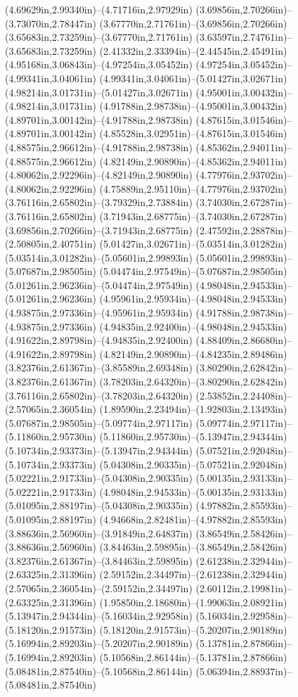(4.69629in,2.99340in)--(4.71716in,2.97929in) (3.69856in,2.70266in)--(3.73070in,2.78447in) (3.67770in,2.71761in)--(3.69856in,2.70266in) (3.65683in,2.73259in)--(3.67770in,2.71761in) (3.63597in,2.74761in)--(3.65683in,2.73259in) (2.41332in,2.33394in)--(2.44545in,2.45491in) (4.95168in,3.06843in)--(4.97254in,3.05452in) (4.97254in,3.05452in)--(4.99341in,3.04061in) (4.99341in,3.04061in)--(5.01427in,3.02671in) (4.98214in,3.01731in)--(5.01427in,3.02671in) (4.95001in,3.00432in)--(4.98214in,3.01731in) (4.91788in,2.98738in)--(4.95001in,3.00432in) (4.89701in,3.00142in)--(4.91788in,2.98738in) (4.87615in,3.01546in)--(4.89701in,3.00142in) (4.85528in,3.02951in)--(4.87615in,3.01546in) (4.88575in,2.96612in)--(4.91788in,2.98738in) (4.85362in,2.94011in)--(4.88575in,2.96612in) (4.82149in,2.90890in)--(4.85362in,2.94011in) (4.80062in,2.92296in)--(4.82149in,2.90890in) (4.77976in,2.93702in)--(4.80062in,2.92296in) (4.75889in,2.95110in)--(4.77976in,2.93702in) (3.76116in,2.65802in)--(3.79329in,2.73884in) (3.74030in,2.67287in)--(3.76116in,2.65802in) (3.71943in,2.68775in)--(3.74030in,2.67287in) (3.69856in,2.70266in)--(3.71943in,2.68775in) (2.47592in,2.28878in)--(2.50805in,2.40751in) (5.01427in,3.02671in)--(5.03514in,3.01282in) (5.03514in,3.01282in)--(5.05601in,2.99893in) (5.05601in,2.99893in)--(5.07687in,2.98505in) (5.04474in,2.97549in)--(5.07687in,2.98505in) (5.01261in,2.96236in)--(5.04474in,2.97549in) (4.98048in,2.94533in)--(5.01261in,2.96236in) (4.95961in,2.95934in)--(4.98048in,2.94533in) (4.93875in,2.97336in)--(4.95961in,2.95934in) (4.91788in,2.98738in)--(4.93875in,2.97336in) (4.94835in,2.92400in)--(4.98048in,2.94533in) (4.91622in,2.89798in)--(4.94835in,2.92400in) (4.88409in,2.86680in)--(4.91622in,2.89798in) (4.82149in,2.90890in)--(4.84235in,2.89486in) (3.82376in,2.61367in)--(3.85589in,2.69348in) (3.80290in,2.62842in)--(3.82376in,2.61367in) (3.78203in,2.64320in)--(3.80290in,2.62842in) (3.76116in,2.65802in)--(3.78203in,2.64320in) (2.53852in,2.24408in)--(2.57065in,2.36054in) (1.89590in,2.23494in)--(1.92803in,2.13493in) (5.07687in,2.98505in)--(5.09774in,2.97117in) (5.09774in,2.97117in)--(5.11860in,2.95730in) (5.11860in,2.95730in)--(5.13947in,2.94344in) (5.10734in,2.93373in)--(5.13947in,2.94344in) (5.07521in,2.92048in)--(5.10734in,2.93373in) (5.04308in,2.90335in)--(5.07521in,2.92048in) (5.02221in,2.91733in)--(5.04308in,2.90335in) (5.00135in,2.93133in)--(5.02221in,2.91733in) (4.98048in,2.94533in)--(5.00135in,2.93133in) (5.01095in,2.88197in)--(5.04308in,2.90335in) (4.97882in,2.85593in)--(5.01095in,2.88197in) (4.94668in,2.82481in)--(4.97882in,2.85593in) (3.88636in,2.56960in)--(3.91849in,2.64837in) (3.86549in,2.58426in)--(3.88636in,2.56960in) (3.84463in,2.59895in)--(3.86549in,2.58426in) (3.82376in,2.61367in)--(3.84463in,2.59895in) (2.61238in,2.32944in)--(2.63325in,2.31396in) (2.59152in,2.34497in)--(2.61238in,2.32944in) (2.57065in,2.36054in)--(2.59152in,2.34497in) (2.60112in,2.19981in)--(2.63325in,2.31396in) (1.95850in,2.18680in)--(1.99063in,2.08921in) (5.13947in,2.94344in)--(5.16034in,2.92958in) (5.16034in,2.92958in)--(5.18120in,2.91573in) (5.18120in,2.91573in)--(5.20207in,2.90189in) (5.16994in,2.89203in)--(5.20207in,2.90189in) (5.13781in,2.87866in)--(5.16994in,2.89203in) (5.10568in,2.86144in)--(5.13781in,2.87866in) (5.08481in,2.87540in)--(5.10568in,2.86144in) (5.06394in,2.88937in)--(5.08481in,2.87540in) 